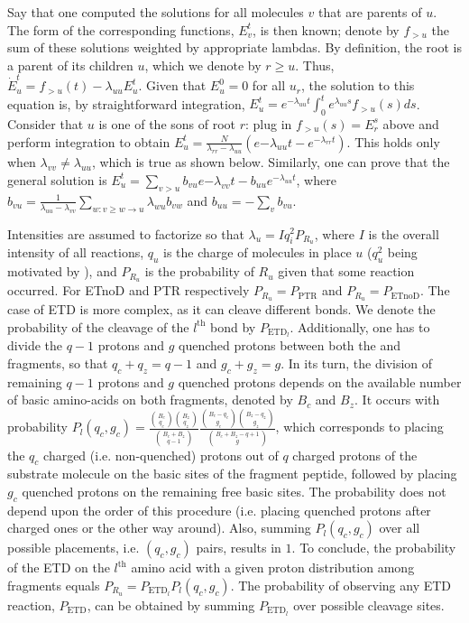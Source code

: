 \documentclass{llncs}
\begin{document}
        Say that one computed the solutions for all molecules $v$ that are parents of $u$.
        The form of the corresponding functions, $E_v^t$, is then known; denote by $f_{>u}$ the sum of these solutions weighted by appropriate lambdas.
        By definition, the root is a parent of its children $u$, which we denote by $r \geq u$.
        Thus, $\dot E_u^t=f_{>u}(t)-\lambda_{uu} E_u^t$. Given that $E_u^0=0$ for all $u_r$, the solution to this equation is, by straightforward integration, $E_u^t=e^{-\lambda_{uu}t} \int_0^t e^{\lambda_{uu}s} f_{>u}(s)ds$.
        Consider that $u$ is one of the sons of root $r$: plug in $f_{>u}(s)=E_r^s$ above and perform integration to obtain $E_u^t= \frac{N}{\lambda_{rr}-\lambda_{uu}}(e{-\lambda_{uu}t}-e^{-\lambda_{rr}t})$.
        This holds only when $\lambda_{vv}\not=\lambda_{uu}$, which is true as shown below.
        Similarly, one can prove that the general solution is $E_u^t=\sum_{v>u}b_{vu}e{-\lambda_{vv}t}-b_{uu}e^{-\lambda_{uu}t}$, where $b_{vu}= \frac{1}{\lambda_{uu}-\lambda_{vv}} \sum_{w: v\geq w \rightarrow u} \lambda_{wu}b_{vw}$ and  $b_{uu}=-\sum_v b_{vu}.$

        Intensities are assumed to factorize  so that $\lambda_u = I q_i^2 P_{R_u}$, where $I$ is the overall intensity of all reactions, $q_u$ is the charge of molecules in place $u$ ($q_u^2$ being motivated by \cite{McLuckey1999-su}), and $P_{R_u}$ is the probability of $R_u$ given that some reaction occurred. For ETnoD and PTR respectively $P_{R_u}=P_\text{PTR}$ and $P_{R_u}=P_\text{ETnoD}$.
        The case of ETD is more complex, as it can cleave different bonds. We denote the probability of the cleavage of the $l^\text{th}$ bond by $P_{\text{ETD}_l}$. Additionally, one has to divide the $q-1$ protons and $g$ quenched protons between both the  and  fragments, so that $q_c+q_z=q-1$ and $g_c+g_z = g$. In its turn, the division of remaining $q-1$ protons and $g$ quenched protons depends on the available number of basic amino-acids on both fragments, denoted by $B_c$ and $B_z$. It occurs with probability $P_l(q_c, g_c) = \frac{ \binom{B_c}{q_c}\binom{B_z}{q_z} }{ \binom{B_c+B_z}{q-1} } \frac{ \binom{B_c - q_c}{g_c} \binom{B_z-q_z}{g_z} }{ \binom{B_c+B_z-q+1}{g} }$,
        which corresponds to placing the $q_c$ charged (i.e. non-quenched) protons out of $q$ charged protons of the substrate molecule on the basic sites of the fragment peptide, followed by placing $g_c$ quenched protons on the remaining free basic sites. The probability does not depend upon the order of this procedure (i.e. placing quenched protons after charged ones or the other way around). Also, summing $P_l(q_c, g_c)$ over all possible placements, i.e. $(q_c, g_c)$ pairs, results in $1$. To conclude, the probability of the ETD on the $l^\text{th}$ amino acid with a given proton distribution among fragments equals $P_{R_u}=P_{\text{ETD}_l} P_l(q_c, g_c)$. The probability of observing any ETD reaction, $P_\text{ETD}$, can be obtained by summing $P_{\text{ETD}_l}$ over possible cleavage sites.
\end{document}
